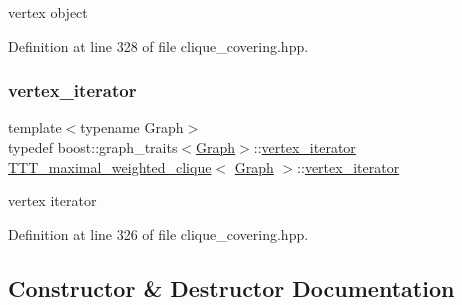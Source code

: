 vertex object 



Definition at line 328 of file clique\+\_\+covering.\+hpp.

\mbox{\label{classTTT__maximal__weighted__clique_ae7392a350cc8858253fe7908320daccd}} 
\subsubsection{\texorpdfstring{vertex\+\_\+iterator}{vertex\_iterator}}
{\footnotesize\ttfamily template$<$typename Graph$>$ \\
typedef boost\+::graph\+\_\+traits$<$\hyperlink{structGraph}{Graph}$>$\+::\hyperlink{classTTT__maximal__weighted__clique_ae7392a350cc8858253fe7908320daccd}{vertex\+\_\+iterator} \hyperlink{classTTT__maximal__weighted__clique}{T\+T\+T\+\_\+maximal\+\_\+weighted\+\_\+clique}$<$ \hyperlink{structGraph}{Graph} $>$\+::\hyperlink{classTTT__maximal__weighted__clique_ae7392a350cc8858253fe7908320daccd}{vertex\+\_\+iterator}\hspace{0.3cm}{\ttfamily [private]}}



vertex iterator 



Definition at line 326 of file clique\+\_\+covering.\+hpp.



\subsection{Constructor \& Destructor Documentation}
\mbox{\label{classTTT__maximal__weighted__clique_ab941eeae406ba82975e33ff856924698}} 
